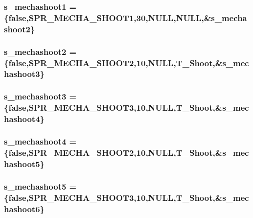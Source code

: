 \label{WL__ACT2_8C_ad5b5f331e922b78dcc8eec9b39b289fb}
\hypertarget{WL__ACT2_8C_a20a81b8449b704b6560857c79da7733c}{
\subsubsection[{s\_\-mechashoot1}]{ {\bf s\_\-mechashoot1} = \{false,SPR\_\-MECHA\_\-SHOOT1,30,NULL,NULL,\&{\bf s\_\-mechashoot2}\}}}
\label{WL__ACT2_8C_a20a81b8449b704b6560857c79da7733c}
\hypertarget{WL__ACT2_8C_a89cca9e88c397fa7dc6a073ddd2312de}{
\subsubsection[{s\_\-mechashoot2}]{ {\bf s\_\-mechashoot2} = \{false,SPR\_\-MECHA\_\-SHOOT2,10,NULL,T\_\-Shoot,\&{\bf s\_\-mechashoot3}\}}}
\label{WL__ACT2_8C_a89cca9e88c397fa7dc6a073ddd2312de}
\hypertarget{WL__ACT2_8C_a6e953972964e0b9fdd5084c254f7b974}{
\subsubsection[{s\_\-mechashoot3}]{ {\bf s\_\-mechashoot3} = \{false,SPR\_\-MECHA\_\-SHOOT3,10,NULL,T\_\-Shoot,\&{\bf s\_\-mechashoot4}\}}}
\label{WL__ACT2_8C_a6e953972964e0b9fdd5084c254f7b974}
\hypertarget{WL__ACT2_8C_a4ede11ddad980badf517d93bc02fd4d0}{
\subsubsection[{s\_\-mechashoot4}]{ {\bf s\_\-mechashoot4} = \{false,SPR\_\-MECHA\_\-SHOOT2,10,NULL,T\_\-Shoot,\&{\bf s\_\-mechashoot5}\}}}
\label{WL__ACT2_8C_a4ede11ddad980badf517d93bc02fd4d0}
\hypertarget{WL__ACT2_8C_a759fd366c222fc6c47d1f0462078f03c}{
\subsubsection[{s\_\-mechashoot5}]{ {\bf s\_\-mechashoot5} = \{false,SPR\_\-MECHA\_\-SHOOT3,10,NULL,T\_\-Shoot,\&{\bf s\_\-mechashoot6}\}}}

